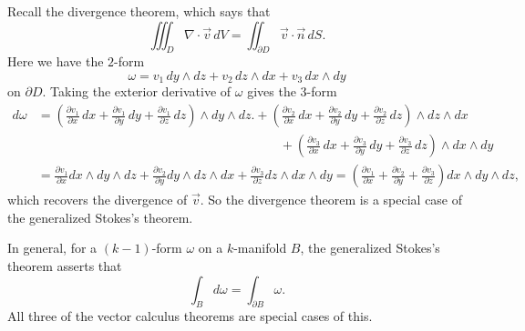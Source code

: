 Recall the divergence theorem, which says that
\[
  \iiint_D \nabla \cdot \vec{v} \, dV = \iint_{\partial D} \vec{v} \cdot \vec{n} \, dS.
\]
Here we have the $2$-form
\[
  \omega = v_1\, dy \land dz + v_2\, dz \land dx + v_3 \, dx \land dy
\]
on $\partial D$. Taking the exterior derivative
of $\omega$ gives the $3$-form
\begin{align*}
  d\omega
  &= \left(\frac{\partial v_1}{\partial x}\, dx + \frac{\partial v_1}{\partial y}\, dy + \frac{\partial v_1}{\partial z}\, dz\right) \land dy \land dz.
  + \left(\frac{\partial v_2}{\partial x}\, dx + \frac{\partial v_2}{\partial y}\, dy + \frac{\partial v_2}{\partial z}\, dz\right) \land dz \land dx \\
  &\hspace{19em}+ \left(\frac{\partial v_3}{\partial x}\, dx + \frac{\partial v_3}{\partial y}\, dy + \frac{\partial v_3}{\partial z}\, dz\right) \land dx \land dy \\
  &= \frac{\partial v_1}{\partial x} dx \land dy \land dz
  + \frac{\partial v_2}{\partial y} dy \land dz \land dx
  + \frac{\partial v_3}{\partial z} dz \land dx \land dy
  = \left(\frac{\partial v_1}{\partial x} + \frac{\partial v_2}{\partial y} + \frac{\partial v_3}{\partial z}\right) dx \land dy \land dz,
\end{align*}
which recovers the divergence of $\vec{v}$. So the
divergence theorem is a special case of the generalized
Stokes's theorem.

In general, for a $(k - 1)$-form $\omega$
on a $k$-manifold $B$, the generalized Stokes's theorem
asserts that
\[
  \int_B d\omega = \int_{\partial B} \omega.
\]
All three of the vector calculus theorems are special
cases of this.
